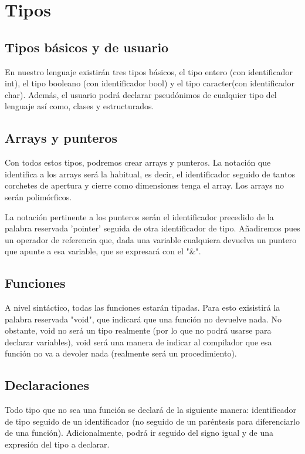 \documentclass{article}
\begin{document}
\section{Tipos}

\subsection{Tipos básicos y de usuario}

En nuestro lenguaje existirán tres tipos básicos, el tipo entero (con identificador int), el tipo booleano (con identificador bool) y el tipo caracter\footnotemark[1] (con identificador char). Además, el usuario podrá declarar pseudónimos de cualquier tipo del lenguaje así como, clases y estructurados.

\subsection{Arrays y punteros}
Con todos estos tipos, podremos crear arrays y punteros\footnotemark[1]. La notación que identifica a los arrays será la habitual, es decir, el identificador seguido de tantos corchetes de apertura y cierre como dimensiones tenga el array. Los arrays no serán polimórficos.

La notación pertinente a los punteros serán el identificador precedido de la palabra reservada 'pointer' seguida de otra identificador de tipo. Añadiremos pues un operador de referencia que, dada una variable cualquiera devuelva un puntero que apunte a esa variable, que se expresará con el "\&".

\subsection{Funciones}

A nivel sintáctico, todas las funciones estarán tipadas. Para esto exisistirá la palabra reservada "void", que indicará que una función no devuelve nada. No obstante, void no será un tipo realmente (por lo que no podrá usarse para declarar variables), void será una manera de indicar al compilador que esa función no va a devoler nada (realmente será un procedimiento).

\subsection{Declaraciones}

Todo tipo que no sea una función se declará de la siguiente manera: identificador de tipo seguido de un identificador (no seguido de un paréntesis para diferenciarlo de una función). Adicionalmente, podrá ir seguido del signo igual y de una expresión del tipo a declarar. 
\end{document}
